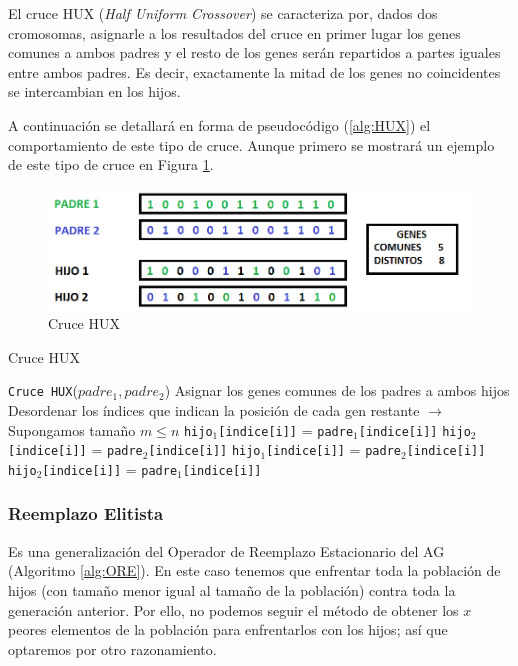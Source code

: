 El cruce HUX (\textit{Half Uniform Crossover}) se caracteriza por, dados dos cromosomas, asignarle a los resultados del cruce en primer lugar los genes comunes a ambos padres y el resto de los genes serán repartidos a partes iguales entre ambos padres. 
Es decir, exactamente la mitad de los genes no coincidentes se intercambian en los hijos. 

A continuación se detallará en forma de pseudocódigo (\ref{alg:HUX}) el comportamiento de este tipo de cruce. 
Aunque primero se mostrará un ejemplo de este tipo de cruce en Figura \ref{fig:HUX}.

\begin{figure}
		\centering
		\includegraphics[scale=0.5]{imagenes/CrossoverHUX.png}
        \caption{Cruce HUX}
        \label{fig:HUX}
\end{figure}

\begin{algorithm}
\caption{Cruce HUX}\label{alg:HUX}
\begin{algorithmic}[1]
\Procedure \texttt{Cruce HUX}($padre_1, padre_2$)
\State Asignar los genes comunes de los padres a ambos hijos
\State Desordenar los índices que indican la posición de cada gen restante $\xrightarrow{}{}$ Supongamos tamaño $m \leq n$
		\State \texttt{hijo$_1$[indice[i]]} = \texttt{padre$_1$[indice[i]]}
		\State \texttt{hijo$_2$[indice[i]]} = \texttt{padre$_2$[indice[i]]}
	\Else
		\State \texttt{hijo$_1$[indice[i]]} = \texttt{padre$_2$[indice[i]]}
		\State \texttt{hijo$_2$[indice[i]]} = \texttt{padre$_1$[indice[i]]}
	\EndIf
\EndFor
\EndProcedure
\end{algorithmic}
\end{algorithm}

\subsubsection{Reemplazo Elitista}

Es una generalización del Operador de Reemplazo Estacionario del AG (Algoritmo \ref{alg:ORE}). 
En este caso tenemos que enfrentar toda la población de hijos (con tamaño menor igual al tamaño de la población) contra toda la generación anterior. 
Por ello, no podemos seguir el método de obtener los $x$ peores elementos de la población para enfrentarlos con los hijos; así que optaremos por otro razonamiento. 

